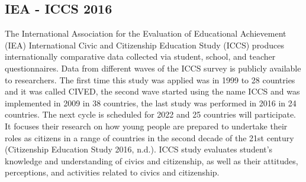 \documentclass[12pt,a4paper,oneside]{reedthesis}
\begin{document}
\hypertarget{iea---iccs-2016}{%
\subsection{IEA - ICCS 2016}\label{iea---iccs-2016}}

The International Association for the Evaluation of Educational Achievement (IEA) International Civic and Citizenship Education Study (ICCS) produces internationally comparative data collected via student, school, and teacher questionnaires. Data from different waves of the ICCS survey is publicly available to researchers. The first time this study was applied was in 1999 to 28 countries and it was called CIVED, the second wave started using the name ICCS and was implemented in 2009 in 38 countries, the last study was performed in 2016 in 24 countries. The next cycle is scheduled for 2022 and 25 countries will participate. It focuses their research on how young people are prepared to undertake their roles as citizens in a range of countries in the second decade of the 21st century (Citizenship Education Study 2016, n.d.). ICCS study evaluates student's knowledge and understanding of civics and citizenship, as well as their attitudes, perceptions, and activities related to civics and citizenship.
\end{document}
